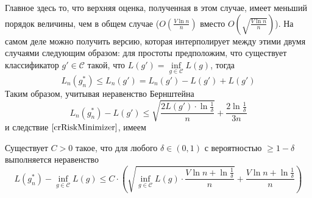 \documentclass[12pt]{article}
\newtheorem{corollary}{\hskip\parindent Следствие}%
\begin{document}
Главное здесь то, что верхняя оценка, полученная в этом случае, имеет меньший порядок величины, чем в общем случае ($O\left(\frac{V\ln n}{n}\right)$ вместо $O\left(\sqrt{\frac{V\ln n}{n}}\right)$). На самом деле можно получить версию, которая интерполирует между этими двумя случаями следующим образом: для простоты предположим, что существует классификатор $g'\in\mathcal{C}$ такой, что $L(g')=\inf\limits_{g\in\mathcal{C}}L(g)$, тогда
\begin{equation*}
	L_n(g_n^*)\leqslant L_n(g')=L_n(g')-L(g')+L(g')
\end{equation*}
Таким образом, учитывая неравенство Бернштейна
\begin{equation*}
	L_n(g_n^*)-L(g')\leqslant\sqrt{\frac{2L(g')\cdot\ln\frac{1}{\delta}}{n}}+\frac{2\ln\frac{1}{\delta}}{3n}
\end{equation*}
и следствие $\ref{crRiskMinimizer}$, имеем
\begin{corollary}
	Существует $C>0$ такое, что для любого $\delta\in(0,1)$ с вероятностью $\geqslant1-\delta$ выполняется неравенство
	\begin{equation*}
		L(g_n^*)-\inf\limits_{g\in\mathcal{C}}L(g)\leqslant C\cdot\left(\sqrt{\inf\limits_{g\in\mathcal{C}}L(g)\cdot\frac{V\ln n+\ln\frac{1}{\delta}}{n}}+\frac{V\ln n+\ln\frac{1}{\delta}}{n}\right)
	\end{equation*}
\end{corollary}
\end{document}
